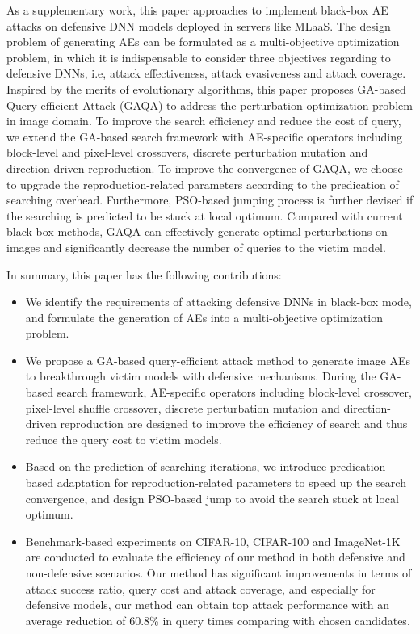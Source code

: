 \documentclass[lettersize,journal]{IEEEtran}
\begin{document}
As a supplementary work, this paper approaches to implement black-box AE attacks on defensive DNN models deployed in servers like MLaaS. The design problem of generating AEs can be formulated as a multi-objective optimization problem, in which it is indispensable to consider three objectives regarding to defensive DNNs, i.e, attack effectiveness, attack evasiveness and attack coverage. Inspired by the merits of evolutionary algorithms, this paper proposes GA-based Query-efficient Attack (GAQA) to address the perturbation optimization problem in image domain. To improve the search efficiency and reduce the cost of query, we extend the GA-based search framework with AE-specific operators including block-level and pixel-level crossovers, discrete perturbation mutation and direction-driven reproduction. To improve the convergence of GAQA, we choose to upgrade the reproduction-related parameters according to the predication of searching overhead. Furthermore, PSO-based jumping process is further devised if the searching is predicted to be stuck at local optimum. Compared with current black-box methods, GAQA can effectively generate optimal perturbations on images and significantly decrease the number of queries to the victim model.

In summary, this paper has the following contributions:
\begin{itemize}
\item	We identify the requirements of attacking defensive DNNs in black-box mode, and formulate the generation of AEs into a multi-objective optimization problem.
\item	We propose a GA-based query-efficient attack method to generate image AEs to breakthrough victim models with defensive mechanisms. During the GA-based search framework, AE-specific operators including block-level crossover, pixel-level shuffle crossover, discrete perturbation mutation and direction-driven reproduction are designed to improve the efficiency of search and thus reduce the query cost to victim models.
\item   Based on the prediction of searching iterations, we introduce predication-based adaptation for reproduction-related parameters to speed up the search convergence, and design PSO-based jump to avoid the search stuck at local optimum.
\item  Benchmark-based experiments on CIFAR-10, CIFAR-100 and ImageNet-1K are conducted to evaluate the efficiency of our method in both defensive and non-defensive scenarios. Our method has significant improvements in terms of attack success ratio, query cost and attack coverage, and especially for defensive models, our method can obtain top attack performance with an average reduction of 60.8\% in query times comparing with chosen candidates.
\end{itemize}
\end{document}
